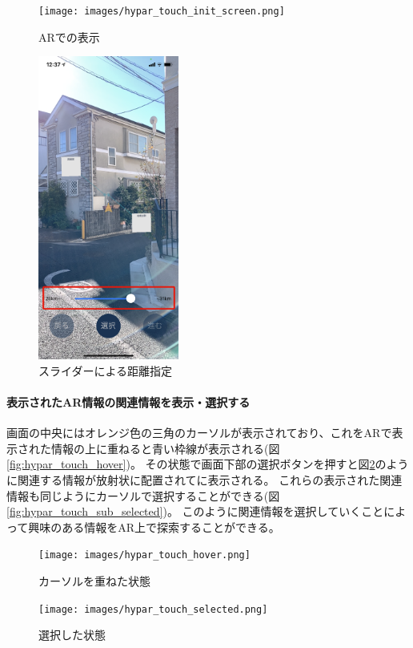 \begin{figure}[h]
  \begin{minipage}{0.5\hsize}
    \centering
    \texttt{[image: images/hypar\_touch\_init\_screen.png]}
    \caption{ARでの表示} \label{fig:hypar_touch_init_screen}
  \end{minipage}
  \begin{minipage}{0.5\hsize}
    \centering
    \includegraphics[height=100mm]{images/hypar_touch_slider.png}
    \caption{スライダーによる距離指定} \label{fig:hypar_touch_slider}
  \end{minipage}
\end{figure}

\paragraph*{表示されたAR情報の関連情報を表示・選択する}
画面の中央にはオレンジ色の三角のカーソルが表示されており、これをARで表示された情報の上に重ねると青い枠線が表示される(図\ref{fig:hypar_touch_hover})。
その状態で画面下部の選択ボタンを押すと図\ref{fig:hypar_touch_selected}のように関連する情報が放射状に配置されてに表示される。
これらの表示された関連情報も同じようにカーソルで選択することができる(図\ref{fig:hypar_touch_sub_selected})。
このように関連情報を選択していくことによって興味のある情報をAR上で探索することができる。

\begin{figure}[h]
  \begin{minipage}{0.5\hsize}
    \centering
    \texttt{[image: images/hypar\_touch\_hover.png]}
    \caption{カーソルを重ねた状態} \label{fig:hypar_touch_hover}
  \end{minipage}
  \begin{minipage}{0.5\hsize}
    \centering
    \texttt{[image: images/hypar\_touch\_selected.png]}
    \caption{選択した状態} \label{fig:hypar_touch_selected}
  \end{minipage}
\end{figure}

